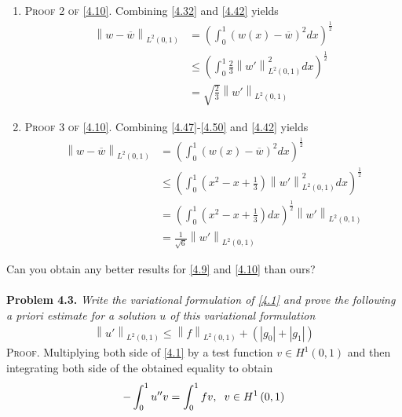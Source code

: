 \documentclass[a4paper]{article}
\numberwithin{equation}{section}
\begin{document}
\begin{enumerate}
\item \textsc{Proof 2 of \eqref{4.10}.} Combining \eqref{4.32} and \eqref{4.42} yields
\begin{align}
{\left\| {w - \overline w } \right\|_{{L^2}\left( {0,1} \right)}} &= {\left( {\int_0^1 {{{\left( {w\left( x \right) - \overline w } \right)}^2}dx} } \right)^{\frac{1}{2}}}\\
 &\le {\left( {\int_0^1 {\frac{2}{3}\left\| {w'} \right\|_{{L^2}\left( {0,1} \right)}^2dx} } \right)^{\frac{1}{2}}}\\
 &= \sqrt {\frac{2}{3}} {\left\| {w'} \right\|_{{L^2}\left( {0,1} \right)}} \label{4.53}
\end{align}
\item \textsc{Proof 3 of \eqref{4.10}.} Combining \eqref{4.47}-\eqref{4.50} and \eqref{4.42} yields
\begin{align}
{\left\| {w - \overline w } \right\|_{{L^2}\left( {0,1} \right)}} &= {\left( {\int_0^1 {{{\left( {w\left( x \right) - \overline w } \right)}^2}dx} } \right)^{\frac{1}{2}}}\\
& \le {\left( {\int_0^1 {\left( {{x^2} - x + \frac{1}{3}} \right)\left\| {w'} \right\|_{{L^2}\left( {0,1} \right)}^2dx} } \right)^{\frac{1}{2}}}\\
& = {\left( {\int_0^1 {\left( {{x^2} - x + \frac{1}{3}} \right)dx} } \right)^{\frac{1}{2}}}{\left\| {w'} \right\|_{{L^2}\left( {0,1} \right)}}\\
& = \frac{1}{{\sqrt 6 }}{\left\| {w'} \right\|_{{L^2}\left( {0,1} \right)}} \label{4.57}
\end{align}
\end{enumerate}
Can you obtain any better results for \eqref{4.9} and \eqref{4.10} than ours?\\
\\
\textbf{Problem 4.3.} \textit{Write the variational formulation of \eqref{4.1} and prove the following a priori estimate for a solution $u$ of this variational formulation}
\begin{align}
\label{4.58}
{\left\| {u'} \right\|_{{L^2}\left( {0,1} \right)}} \le {\left\| f \right\|_{{L^2}\left( {0,1} \right)}} + \left( {\left| {{g_0}} \right| + \left| {{g_1}} \right|} \right)
\end{align} 
\textsc{Proof.} Multiplying both side of \eqref{4.1} by a test function $v\in H^1\left(0,1\right)$ and then integrating both side of the obtained equality to obtain
\begin{align}
\label{4.59}
 - \int_0^1 {u''v}  = \int_0^1 {fv} ,\hspace{0.2cm} v \in {H^1}\left( {0,1} \right)
\end{align}
\end{document}
